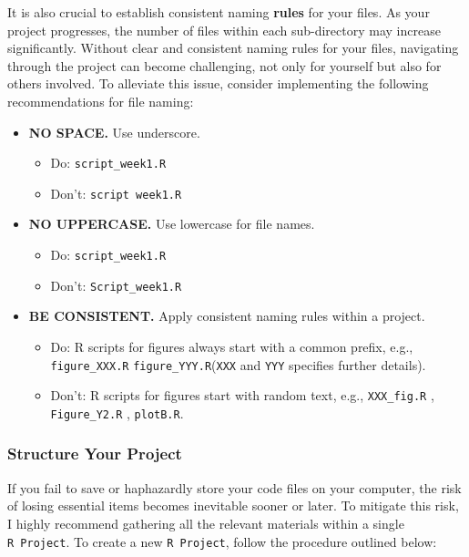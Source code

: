 \documentclass[
]{article}
\providecommand{\tightlist}{%
  \setlength{\itemsep}{0pt}\setlength{\parskip}{0pt}}
\begin{document}
It is also crucial to establish consistent naming \textbf{rules} for your files. As your project progresses, the number of files within each sub-directory may increase significantly. Without clear and consistent naming rules for your files, navigating through the project can become challenging, not only for yourself but also for others involved. To alleviate this issue, consider implementing the following recommendations for file naming:

\begin{itemize}
\tightlist
\item
  \textbf{NO SPACE.} Use underscore.

  \begin{itemize}
  \tightlist
  \item
    Do: \texttt{script\_week1.R}
  \item
    Don't: \texttt{script\ week1.R}
  \end{itemize}
\item
  \textbf{NO UPPERCASE.} Use lowercase for file names.

  \begin{itemize}
  \tightlist
  \item
    Do: \texttt{script\_week1.R}
  \item
    Don't: \texttt{Script\_week1.R}
  \end{itemize}
\item
  \textbf{BE CONSISTENT.} Apply consistent naming rules within a project.

  \begin{itemize}
  \tightlist
  \item
    Do: R scripts for figures always start with a common prefix, e.g., \texttt{figure\_XXX.R} \texttt{figure\_YYY.R}(\texttt{XXX} and \texttt{YYY} specifies further details).
  \item
    Don't: R scripts for figures start with random text, e.g., \texttt{XXX\_fig.R} , \texttt{Figure\_Y2.R} , \texttt{plotB.R}.
  \end{itemize}
\end{itemize}

\hypertarget{structure-your-project}{%
\subsubsection{Structure Your Project}\label{structure-your-project}}

If you fail to save or haphazardly store your code files on your computer, the risk of losing essential items becomes inevitable sooner or later. To mitigate this risk, I highly recommend gathering all the relevant materials within a single \texttt{R\ Project}. To create a new \texttt{R\ Project}, follow the procedure outlined below:
\end{document}
